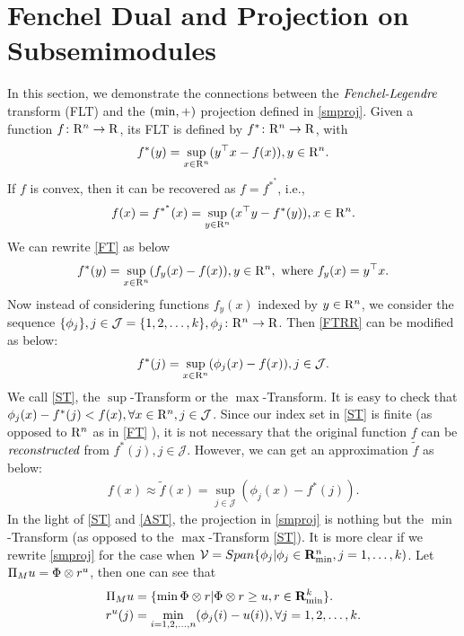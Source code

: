 \section{Fenchel Dual and Projection on Subsemimodules}\label{fenchel}
In this section, we demonstrate the connections between the $\emph{Fenchel-Legendre}$ transform (FLT) and the $(\min,+)$ projection defined in \eqref{smproj}. Given a function $f \colon \mathrm{R}^n \rightarrow \mathrm{R}$, its FLT is defined by $f^* \colon \mathrm{R}^n \rightarrow \mathrm{R}$, with
\begin{align}\label{FT}
f^*(y)=\sup_{x \in \mathrm{R}^n}(y^\top x-f(x)), y \in \mathrm{R}^n.
\end{align}
If $f$ is convex, then it can be recovered as $f=f^{*^*}$, i.e.,
\begin{align}\label{FFT}
f(x)=f^{*^*}(x)=\sup_{y \in \mathrm{R}^n}(x^\top y-f^*(y)), x \in \mathrm{R}^n.
\end{align}
We can rewrite \eqref{FT} as below
\begin{align}\label{FTRR}
f^*(y)=\sup_{x \in \mathrm{R}^n}(f_y(x)-f(x)), y \in \mathrm{R}^n, \text{ where }f_y(x)=y^\top x.
\end{align}
Now instead of considering functions $f_y(x)$ indexed by $y \in \mathrm{R}^n$, we consider the sequence $\{\phi_j\}, j \in \mathcal{J}=\{1,2,\ldots,k\}, \phi_j \colon \mathrm{R}^n \rightarrow \mathrm{R}$. Then \eqref{FTRR} can be modified as below:
\begin{align}\label{ST}
f^*(j)=\sup_{x \in \mathrm{R}^n}(\phi_j(x)-f(x)), j \in \mathcal{J}.
\end{align}
We call \eqref{ST}, the $\sup$-Transform or the $\max$-Transform. It is easy to check that $\phi_j(x)-f^*(j) <f(x), \forall x \in \mathrm{R}^n, j \in \mathcal{J}$. Since our index set in \eqref{ST} is finite (as opposed to $\mathrm{R}^n$ as in \eqref{FT} ), it is not necessary that the original function $f$ can be $\emph{reconstructed}$ from $f^*(j), j \in \mathcal{J}$. However, we can get an approximation $\tilde{f}$ as below:
\begin{align}\label{AST}
f(x)\approx\tilde{f}(x)=\sup_{j \in \mathcal{J}}(\phi_j(x)-f^*(j)).
\end{align}
In the light of \eqref{ST} and \eqref{AST}, the projection in \eqref{smproj} is nothing but the $\min$-Transform (as opposed to the $\max$-Transform \eqref{ST}). It is more clear if we rewrite \eqref{smproj} for the case when $\mathcal{V}=Span\{\phi_j|\phi_j \in \mathbf{R}_{\min}^n, j=1,\ldots,k)$. Let $\Pi_M u=\Phi \otimes r^u$, then one can see that
\begin{align}
\Pi_M u&=\{\min\Phi\otimes r|\Phi \otimes r \geq u, r \in \mathbf{R}_{\min}^k\}.\\
r^u(j)&= \min_{i =1,2,\ldots, n} (\phi_j(i)-u(i)), \forall j=1,2,\ldots,k.\label{mpproj}
\end{align}
